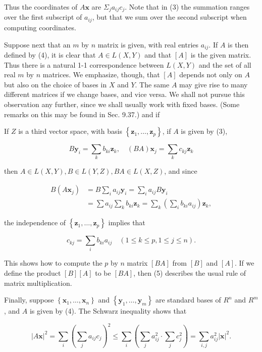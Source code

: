 \documentclass[10pt]{article}
\begin{document}
Thus the coordinates of $A \mathbf{x}$ are $\Sigma_{j} a_{i j} c_{j}$. Note that in (3) the summation ranges over the first subscript of $a_{i j}$, but that we sum over the second subscript when computing coordinates.

Suppose next that an $m$ by $n$ matrix is given, with real entries $a_{i j}$. If $A$ is then defined by (4), it is clear that $A \in L(X, Y)$ and that $[A]$ is the given matrix. Thus there is a natural 1-1 correspondence between $L(X, Y)$ and the set of all real $m$ by $n$ matrices. We emphasize, though, that $[A]$ depends not only on $A$ but also on the choice of bases in $X$ and $Y$. The same $A$ may give rise to many different matrices if we change bases, and vice versa. We shall not pursue this observation any further, since we shall usually work with fixed bases. (Some remarks on this may be found in Sec. 9.37.) and if

If $Z$ is a third vector space, with basis $\left\{\mathbf{z}_{1}, \ldots, \mathbf{z}_{p}\right\}$, if $A$ is given by (3),

$$
B \mathbf{y}_{i}=\sum_{k} b_{k i} \mathbf{z}_{k}, \quad(B A) \mathbf{x}_{j}=\sum_{k} c_{k j} \mathbf{z}_{k}
$$

then $A \in L(X, Y), B \in L(Y, Z), B A \in L(X, Z)$, and since

$$
\begin{aligned}
B\left(A \mathbf{x}_{j}\right) & =B \sum_{i} a_{i j} \mathbf{y}_{i}=\sum_{i} a_{i j} B \mathbf{y}_{i} \\
& =\sum a_{i j} \sum_{k} b_{k i} \mathbf{z}_{k}=\sum_{k}\left(\sum_{i} b_{k i} a_{i j}\right) \mathbf{z}_{k},
\end{aligned}
$$

the independence of $\left\{\mathbf{z}_{1}, \ldots, \mathbf{z}_{p}\right\}$ implies that

$$
c_{k j}=\sum_{i} b_{k i} a_{i j} \quad(1 \leq k \leq p, 1 \leq j \leq n) .
$$

This shows how to compute the $p$ by $n$ matrix $[B A]$ from $[B]$ and $[A]$. If we define the product $[B][A]$ to be $[B A]$, then (5) describes the usual rule of matrix multiplication.

Finally, suppose $\left\{\mathbf{x}_{1}, \ldots, \mathbf{x}_{n}\right\}$ and $\left\{\mathbf{y}_{1}, \ldots, \mathbf{y}_{m}\right\}$ are standard bases of $R^{n}$ and $R^{m}$, and $A$ is given by (4). The Schwarz inequality shows that

$$
|A \mathbf{x}|^{2}=\sum_{i}\left(\sum_{j} a_{i j} c_{j}\right)^{2} \leq \sum_{i}\left(\sum_{j} a_{i j}^{2} \cdot \sum_{j} c_{j}^{2}\right)=\sum_{i, j} a_{i j}^{2}|\mathbf{x}|^{2} .
$$
\end{document}
